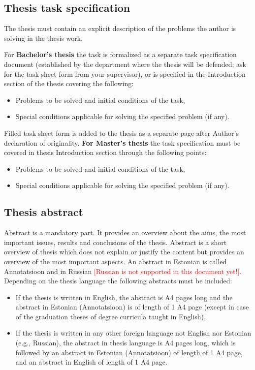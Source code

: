 \subsection{Thesis task specification}

The thesis must contain an explicit description of the problems the
author is solving in the thesis work.

For \textbf{Bachelor’s thesis} the task is formalized as a separate
task specification document (established by the department where the
thesis will be defended; ask for the task sheet form from your
supervisor), or is specified in the Introduction section of the thesis
covering the following:
\begin{itemize}
\item Problems to be solved and initial conditions of the task,
\item Special conditions applicable for solving the specified problem (if any).
\end{itemize}
Filled task sheet form is added to the thesis as a separate page after
Author’s declaration of originality.
\textbf{For Master’s thesis} the task specification must be covered in
thesis Introduction section through the following points:
\begin{itemize}
\item  Problems to be solved and initial conditions of the task,
\item Special conditions applicable for solving the specified problem (if any).
\end{itemize}

\subsection{Thesis abstract}

Abstract is a mandatory part. It provides an overview about the aims,
the most important issues, results and conclusions of the
thesis. Abstract is a short overview of thesis which does not explain
or justify the content but provides an overview of the most important
aspects. An abstract in Estonian is called Annotatsioon and in Russian
\textcolor{red}{[Russian is not supported in this document yet!]}.
Depending on the thesis language the following abstracts must be
included:
\begin{itemize}
\item If the thesis is written in English, the abstract is
   A4 pages long and the abstract in Estonian (Annotatsioon)
  is of length of 1 A4 page (except in case of the graduation theses of
  degree curricula taught in English).

\item If the thesis is written in any other foreign language not
  English nor Estonian (e.g., Russian), the abstract in thesis language
  is  A4 pages long, which is followed by an abstract in
  Estonian (Annotatsioon) of length of 1 A4 page, and an abstract in
  English of length of 1 A4 page.
\end{itemize}

